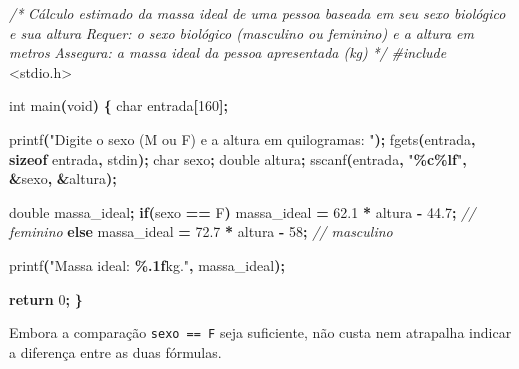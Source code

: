 \documentclass[
  11pt,
  a4paper,
]{scrbook}
\newenvironment{Shaded}{\begin{snugshade}}{\end{snugshade}}
\newcommand{\CharTok}[1]{\textcolor[rgb]{0.31,0.60,0.02}{#1}}
\newcommand{\CommentTok}[1]{\textcolor[rgb]{0.56,0.35,0.01}{\textit{#1}}}
\newcommand{\ControlFlowTok}[1]{\textcolor[rgb]{0.13,0.29,0.53}{\textbf{#1}}}
\newcommand{\DataTypeTok}[1]{\textcolor[rgb]{0.13,0.29,0.53}{#1}}
\newcommand{\DecValTok}[1]{\textcolor[rgb]{0.00,0.00,0.81}{#1}}
\newcommand{\FloatTok}[1]{\textcolor[rgb]{0.00,0.00,0.81}{#1}}
\newcommand{\ImportTok}[1]{#1}
\newcommand{\KeywordTok}[1]{\textcolor[rgb]{0.13,0.29,0.53}{\textbf{#1}}}
\newcommand{\NormalTok}[1]{#1}
\newcommand{\OperatorTok}[1]{\textcolor[rgb]{0.81,0.36,0.00}{\textbf{#1}}}
\newcommand{\PreprocessorTok}[1]{\textcolor[rgb]{0.56,0.35,0.01}{\textit{#1}}}
\newcommand{\SpecialCharTok}[1]{\textcolor[rgb]{0.81,0.36,0.00}{\textbf{#1}}}
\newcommand{\StringTok}[1]{\textcolor[rgb]{0.31,0.60,0.02}{#1}}
\begin{document}
\begin{Shaded}
\begin{Highlighting}[]
\CommentTok{/*}
\CommentTok{Cálculo estimado da massa ideal de uma pessoa baseada em seu sexo biológico}
\CommentTok{e sua altura}
\CommentTok{Requer: o sexo biológico (masculino ou feminino) e a altura em metros}
\CommentTok{Assegura: a massa ideal da pessoa apresentada (kg)}
\CommentTok{*/}
\PreprocessorTok{\#include }\ImportTok{\textless{}stdio.h\textgreater{}}

\DataTypeTok{int}\NormalTok{ main}\OperatorTok{(}\DataTypeTok{void}\OperatorTok{)} \OperatorTok{\{}
    \DataTypeTok{char}\NormalTok{ entrada}\OperatorTok{[}\DecValTok{160}\OperatorTok{];}

\NormalTok{    printf}\OperatorTok{(}\StringTok{"Digite o sexo (M ou F) e a altura em quilogramas: "}\OperatorTok{);}
\NormalTok{    fgets}\OperatorTok{(}\NormalTok{entrada}\OperatorTok{,} \KeywordTok{sizeof}\NormalTok{ entrada}\OperatorTok{,}\NormalTok{ stdin}\OperatorTok{);}
    \DataTypeTok{char}\NormalTok{ sexo}\OperatorTok{;}
    \DataTypeTok{double}\NormalTok{ altura}\OperatorTok{;}
\NormalTok{    sscanf}\OperatorTok{(}\NormalTok{entrada}\OperatorTok{,} \StringTok{"}\SpecialCharTok{\%c\%lf}\StringTok{"}\OperatorTok{,} \OperatorTok{\&}\NormalTok{sexo}\OperatorTok{,} \OperatorTok{\&}\NormalTok{altura}\OperatorTok{);}

    \DataTypeTok{double}\NormalTok{ massa\_ideal}\OperatorTok{;}
    \ControlFlowTok{if}\OperatorTok{(}\NormalTok{sexo }\OperatorTok{==} \CharTok{\textquotesingle{}F\textquotesingle{}}\OperatorTok{)}
\NormalTok{        massa\_ideal }\OperatorTok{=} \FloatTok{62.1} \OperatorTok{*}\NormalTok{ altura }\OperatorTok{{-}} \FloatTok{44.7}\OperatorTok{;}  \CommentTok{// feminino}
    \ControlFlowTok{else}
\NormalTok{        massa\_ideal }\OperatorTok{=} \FloatTok{72.7} \OperatorTok{*}\NormalTok{ altura }\OperatorTok{{-}} \DecValTok{58}\OperatorTok{;}  \CommentTok{// masculino}

\NormalTok{    printf}\OperatorTok{(}\StringTok{"Massa ideal: }\SpecialCharTok{\%.1f}\StringTok{kg."}\OperatorTok{,}\NormalTok{ massa\_ideal}\OperatorTok{);}

    \ControlFlowTok{return} \DecValTok{0}\OperatorTok{;}
\OperatorTok{\}}
\end{Highlighting}
\end{Shaded}

Embora a comparação
\texttt{sexo\ ==\ \textquotesingle{}F\textquotesingle{}} seja
suficiente, não custa nem atrapalha indicar a diferença entre as duas
fórmulas.
\end{document}
